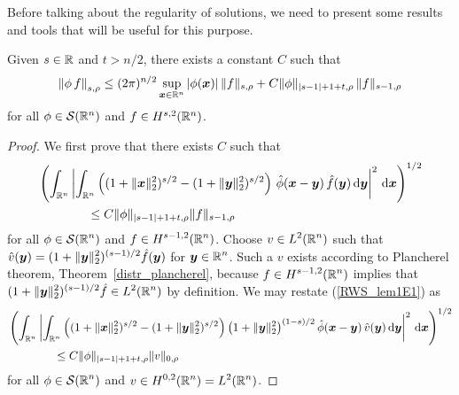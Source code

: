 Before talking about the regularity of solutions, we need to present
some results and tools that will be useful for this purpose.

\begin{lemma} \label{ell_reg_lemma1}
Given $s\in \mathbb{R}$ and $t>n/2$, there exists a constant $C$ such that
\[
  \left\| \phi \, f \right\|_{s,\rho} \leq
(2\pi)^{n/2} \sup_{{\bm{x}} \in \mathbb{R}^n} |\phi({\bm{x}})|\, \|f\|_{s,\rho}
+ C \|\phi\|_{|s-1|+1+t,\rho} \, \|f \|_{s-1,\rho}
\]
for all $\phi \in \mathcal{S}(\mathbb{R}^n)$ and $f \in H^{s,2}(\mathbb{R}^n)$.
\end{lemma}

\begin{proof}
 We first prove that there exists $C$ such that
\begin{equation} \label{RWS_lem1E1}
\begin{split}
&\left( \int_{\mathbb{R}^n} \left|
\int_{\mathbb{R}^n} \left( (1+\|{\bm{x}}\|_2^2)^{s/2} - (1+\|{\bm{y}}\|_2^2)^{s/2}\right)
\, \hat{\phi}({\bm{x}}-{\bm{y}}) \,
\hat{f}({\bm{y}}) \,\mathrm{d}{{\bm{y}}} \right|^2 \,\mathrm{d}{{\bm{x}}} \right)^{1/2}\\
&\qquad \qquad \leq C \|\phi\|_{|s-1|+1+t,\rho}\|f \|_{s-1,\rho}
\end{split}
\end{equation}
for all $\displaystyle \phi \in \mathcal{S}(\mathbb{R}^n)$ and
$\displaystyle f \in H^{s-1,2}(\mathbb{R}^n)$.
Choose $\displaystyle v \in L^2(\mathbb{R}^n)$ such that
$\displaystyle \hat{v}({\bm{y}}) = (1+\|{\bm{y}}\|_2^2)^{(s-1)/2} \hat{f}({\bm{y}})$
for $\displaystyle {\bm{y}} \in \mathbb{R}^n$.  Such a $v$ exists
according to Plancherel theorem, Theorem~\ref{distr_plancherel},
because $\displaystyle f \in H^{s-1,2}(\mathbb{R}^n)$ implies that
$\displaystyle (1 + \|{\bm{y}}\|_2^2)^{(s-1)/2} \hat{f} \in L^2(\mathbb{R}^n)$
by definition.  We may restate (\ref{RWS_lem1E1}) as
\begin{equation} \label{RWS_lem1E2}
\begin{split}
&\left( \int_{\mathbb{R}^n} \left|
\int_{\mathbb{R}^n} \left( (1+\|{\bm{x}}\|_2^2)^{s/2} - (1+\|{\bm{y}}\|_2^2)^{s/2}\right)
\left( 1 + \|{\bm{y}}\|_2^2\right)^{(1-s)/2} \hat{\phi}({\bm{x}}-{\bm{y}}) \,
\hat{v}({\bm{y}}) \,\mathrm{d}{{\bm{y}}} \right|^2 \,\mathrm{d}{{\bm{x}}} \right)^{1/2} \\
&\qquad \qquad \leq C \|\phi\|_{|s-1|+1+t,\rho}\|v \|_{0,\rho}
\end{split}
\end{equation}
for all $\displaystyle \phi \in \mathcal{S}(\mathbb{R}^n)$ and
$\displaystyle v \in H^{0,2}(\mathbb{R}^n) = L^2(\mathbb{R}^n)$.


\end{proof}
